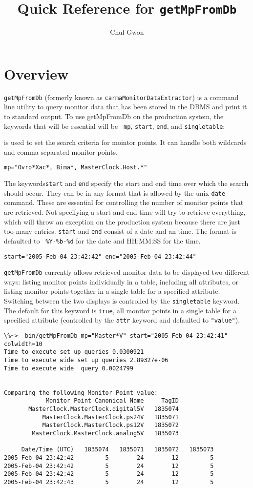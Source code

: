 \documentclass[preprint]{aastex}
\begin{document}
\title{Quick Reference for {\tt getMpFromDb}}
\author{Chul Gwon}

\section{Overview}
{\tt getMpFromDb} (formerly known as {\tt carmaMonitorDataExtractor})
is a command line utility to query monitor data that has been stored
in the DBMS and print it to standard output. To use getMpFromDb on the
production system, the keywords that will be essential will be {\tt
mp}, {\tt start}, {\tt end}, and {\tt singletable}:

 is used to set the search criteria for mointor
points.  It can handle both wildcards and comma-separated monitor
points.

{\tt mp="Ovro*Xac*, Bima*, MasterClock.Host.*"}

\noindent The keywords{\tt start} and {\tt end} specify the start and
end time over which the search should occur.  They can be in any
format that is allowed by the unix {\tt date} command.  These are
essential for controlling the number of monitor points that are
retrieved.  Not specifying a start and end time will try to retrieve
everything, which will throw an exception on the production system
because there are just too many entries.  {\tt start} and {\tt end}
consist of a date and an time.  The format is defaulted to {\tt
\%Y-\%b-\%d} for the date and HH:MM:SS for the time.

{\tt start="2005-Feb-04 23:42:42" end="2005-Feb-04 23:42:44"}

{\tt getMpFromDb} currently allows retrieved monitor data to be
displayed two different ways: listing monitor points individually in a
table, including all attributes, or listing monitor points together in
a single table for a specified attribute.  Switching between the two
displays is controlled by the {\tt singletable} keyword.  The default for
this keyword is {\tt true}, all monitor points in a single table for a
specified attribute (controlled by the {\tt attr} keyword and
defaulted to {\tt "value"}). 

\begin{verbatim}
\%~>  bin/getMpFromDb mp="Master*V" start="2005-Feb-04 23:42:41" colwidth=10
Time to execute set up queries 0.0300921
Time to execute wide set up queries 2.89327e-06
Time to execute wide  query 0.0024799


Comparing the following Monitor Point value: 
            Monitor Point Canonical Name     TagID
       MasterClock.MasterClock.digital5V   1835074
           MasterClock.MasterClock.ps24V   1835071
           MasterClock.MasterClock.ps12V   1835072
        MasterClock.MasterClock.analog5V   1835073

     Date/Time (UTC)   1835074   1835071   1835072   1835073
2005-Feb-04 23:42:42         5        24        12         5
2005-Feb-04 23:42:42         5        24        12         5
2005-Feb-04 23:42:42         5        24        12         5
2005-Feb-04 23:42:43         5        24        12         5

\end{verbatim}
\end{document}
